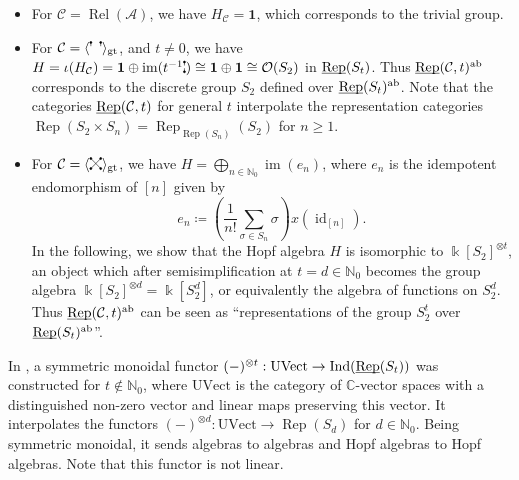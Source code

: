 \documentclass[11pt]{amsart}
\newcommand{\pd}[2][black]{\filldraw[#1] (#2) circle (1.5pt)} %
\newcommand\crossing{\tikz[baseline=(origin.base),scale=0.5]{
    \coordinate (origin) at (0,0); %
    \pd{0,0}; \pd{.5,0}; \pd{0,.5}; \pd{.5,.5};
    \draw (0,0) -- (.5,.5);
    \draw (.5,0) -- (0,.5);
}}
\newcommand\upperdots[1]{\tikz[baseline=(origin.base),scale=0.5]{
    \coordinate (origin) at (0,0);
    \foreach \i in {0,...,\numexpr#1-1\relax} {
        \pd{0.5*\i,.5};
        \draw (0.5*\i,.3) -- (0.5*\i,.5);
    }
}}
\newcommand\verticaldots{\tikz[baseline=(origin.base),scale=0.5]{
    \coordinate (origin) at (0,0);
    \pd{0,0};\pd{0,.5};
    \draw (0,0) -- (0,.18); \draw (0,.32) -- (0,.5);
}}
\theoremstyle{definition}
\theoremstyle{remark}
\newcommand\cA{\mathcal A}
\newcommand\cC{\mathcal C}
\newcommand\kk{\Bbbk}
\newcommand\Rep{\operatorname{Rep}}
\newcommand\uRep{\underline{\smash{\operatorname{Rep}}}}
\newcommand\id{\operatorname{id}}
\newcommand\im{\operatorname{im}}
\newcommand\Ind{\operatorname{Ind}}
\renewcommand\:\colon
\renewcommand\o\otimes
\newcommand\one{\mathbf{1}}
\newcommand\NN{\mathbb N}
\newcommand\CC{\mathbb C}
\renewcommand\o\otimes
\newcommand\cO{\mathcal O}
\renewcommand\:\colon
\newcommand\Rel{\operatorname{Rel}}
\newcommand\ab{^{\mathrm{ab}}}
\newcommand\angl[1]{\langle{}#1\rangle{}} %
\newcommand\gtcategory[1]{\angl{#1}_{\mathrm{gt}}}
\begin{document}
\begin{itemize}
    \item For $\cC = \Rel(\cA)$, we have $H_\cC = \one$, which corresponds to the trivial group.
    \item For $\cC = \gtcategory{\upperdots{2}}$, and $t \ne 0$, we have $H = \iota(H_\cC) = \one \oplus \im(t^{-1} \verticaldots) \cong \one \oplus \one \cong \cO(S_2)$ in $\uRep(S_t)$. Thus $\uRep(\cC, t)\ab$ corresponds to the discrete group $S_2$ defined over $\uRep(S_t)\ab$. Note that the categories $\uRep(\cC, t)$ for general $t$ interpolate the representation categories $\Rep(S_2 \times S_n) = \Rep_{\Rep(S_n)}(S_2)$ for $n \geq 1$.
    \item For $\cC = \gtcategory{\crossing}$, we have $H = \bigoplus_{n \in \NN_0} \im(e_n)$, where $e_n$ is the idempotent endomorphism of $[n]$ given by
    \begin{equation} \label{e:idempotent-hyperoctahedral}
        e_n \coloneqq \left(\frac{1}{n!} \sum_{\sigma \in S_n} \sigma\right) x(\id_{[n]}).
    \end{equation}
    In the following, we show that the Hopf algebra $H$ is isomorphic to $\kk[S_2]^{\o t}$, an object which after semisimplification at $t=d \in \NN_0$ becomes the group algebra $\kk[S_2]^{\o d} = \kk[S_2^d]$, or equivalently the algebra of functions on $S_2^d$. Thus $\uRep(\cC, t)\ab$ can be seen as ``representations of the group $S_2^t$ over $\uRep(S_t)\ab$''.
\end{itemize}

In \cite{reptheocomplexrank}, a symmetric monoidal functor $(-)^{\otimes t}: \mathrm{UVect} \to \Ind(\uRep(S_t))$ was constructed for $t\notin\NN_0$, where $\mathrm{UVect}$ is the category of $\CC$-vector spaces with a distinguished non-zero vector and linear maps preserving this vector. It interpolates the functors $(-)^{\otimes d}: \mathrm{UVect} \to \Rep(S_d)$ for $d \in \NN_0$. Being symmetric monoidal, it sends algebras to algebras and Hopf algebras to Hopf algebras. Note that this functor is not linear.
\end{document}
